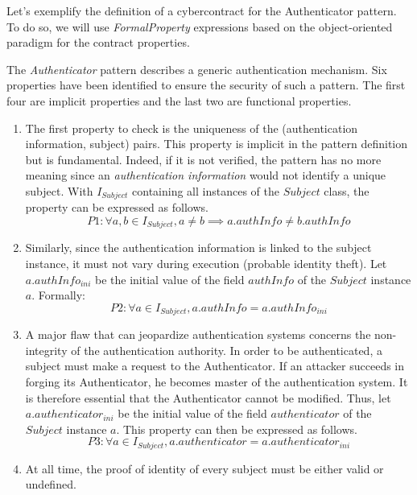 Let's exemplify the definition of a cybercontract for the Authenticator pattern. To do so, we will use \textit{FormalProperty} expressions based on the object-oriented paradigm for the contract properties.

The \textit{Authenticator} pattern describes a generic authentication mechanism. Six properties have been identified to ensure the security of such a pattern. The first four are implicit properties and the last two are functional properties.
\begin{enumerate}
    \item The first property to check is the uniqueness of the (authentication information, subject) pairs. This property is implicit in the pattern definition but is fundamental. Indeed, if it is not verified, the pattern has no more meaning since an \textit{authentication information} would not identify a unique subject. With $I_{Subject}$ containing all instances of the $Subject$ class, the property can be expressed as follows.
    \begin{equation*}
        P1: \forall a, b \in I_{Subject}, a \ne b \implies a.authInfo \ne b.authInfo
    \end{equation*}
    \item Similarly, since the authentication information is linked to the subject instance, it must not vary during execution (probable identity theft). Let $a.authInfo_{ini}$ be the initial value of the field $authInfo$ of the $Subject$ instance $a$. Formally:
    \begin{equation*}
        P2: \forall a \in I_{Subject}, a.authInfo = a.authInfo_{ini}
    \end{equation*}
    \item A major flaw that can jeopardize authentication systems concerns the non-integrity of the authentication authority. In order to be authenticated, a subject must make a request to the Authenticator. If an attacker succeeds in forging its Authenticator, he becomes master of the authentication system. It is therefore essential that the Authenticator cannot be modified. Thus, let  $a.authenticator_{ini}$ be the initial value of the field $authenticator$ of the $Subject$ instance $a$. This property can then be expressed as follows.
    \begin{equation*}
        P3: \forall a \in I_{Subject}, a.authenticator = a.authenticator_{ini}
    \end{equation*}
    \item At all time, the proof of identity of every subject must be either valid or undefined.

\end{enumerate}
